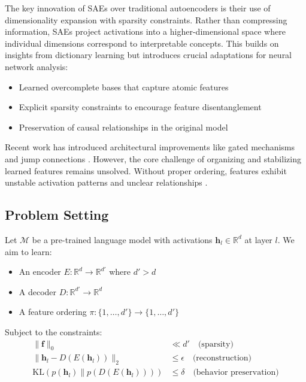 \documentclass{article} %
\begin{document}
The key innovation of SAEs over traditional autoencoders is their use of dimensionality expansion with sparsity constraints. Rather than compressing information, SAEs project activations into a higher-dimensional space where individual dimensions correspond to interpretable concepts. This builds on insights from dictionary learning \cite{Aharon2006rmKA,Mairal2009OnlineLF} but introduces crucial adaptations for neural network analysis:

\begin{itemize}
    \item Learned overcomplete bases that capture atomic features
    \item Explicit sparsity constraints to encourage feature disentanglement
    \item Preservation of causal relationships in the original model
\end{itemize}

Recent work has introduced architectural improvements like gated mechanisms \cite{rajamanoharanImprovingDictionaryLearning2024} and jump connections \cite{rajamanoharanJumpingAheadImproving2024}. However, the core challenge of organizing and stabilizing learned features remains unsolved. Without proper ordering, features exhibit unstable activation patterns and unclear relationships \cite{chaninAbsorptionStudyingFeature2024}.

\subsection{Problem Setting}
Let $\mathcal{M}$ be a pre-trained language model with activations $\mathbf{h}_l \in \mathbb{R}^d$ at layer $l$. We aim to learn:

\begin{itemize}
    \item An encoder $E: \mathbb{R}^d \rightarrow \mathbb{R}^{d'}$ where $d' > d$
    \item A decoder $D: \mathbb{R}^{d'} \rightarrow \mathbb{R}^d$
    \item A feature ordering $\pi: \{1,\ldots,d'\} \rightarrow \{1,\ldots,d'\}$
\end{itemize}

Subject to the constraints:
\begin{align*}
    \|\mathbf{f}\|_0 &\ll d' \quad \text{(sparsity)} \\
    \|\mathbf{h}_l - D(E(\mathbf{h}_l))\|_2 &\leq \epsilon \quad \text{(reconstruction)} \\
    \text{KL}(p(\mathbf{h}_l) \| p(D(E(\mathbf{h}_l)))) &\leq \delta \quad \text{(behavior preservation)}
\end{align*}
\end{document}
